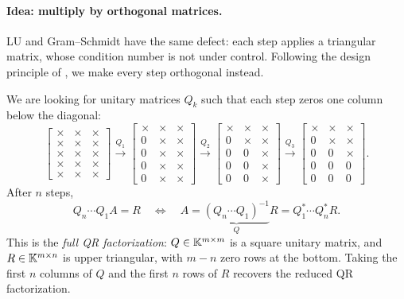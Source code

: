 \paragraph{Idea: multiply by orthogonal matrices.} LU and Gram--Schmidt have the same defect: each step applies a triangular matrix, whose condition number is not under control. Following the design principle of , we make every step orthogonal instead.

We are looking for unitary matrices $Q_k$ such that each step zeros one column below the diagonal:
\begin{equation}
  \begin{bmatrix} \times & \times & \times \\ \times & \times & \times \\ \times & \times & \times \\ \times & \times & \times \\ \times & \times & \times \end{bmatrix}
  \xrightarrow{Q_1}
  \begin{bmatrix} \times & \times & \times \\ 0 & \times & \times \\ 0 & \times & \times \\ 0 & \times & \times \\ 0 & \times & \times \end{bmatrix}
  \xrightarrow{Q_2}
  \begin{bmatrix} \times & \times & \times \\ 0 & \times & \times \\ 0 & 0 & \times \\ 0 & 0 & \times \\ 0 & 0 & \times \end{bmatrix}
  \xrightarrow{Q_3}
  \begin{bmatrix} \times & \times & \times \\ 0 & \times & \times \\ 0 & 0 & \times \\ 0 & 0 & 0 \\ 0 & 0 & 0 \end{bmatrix}.
\end{equation}
After $n$ steps,
\begin{equation}
  Q_n \cdots Q_1A = R \quad\iff\quad A = \underbrace{(Q_n \cdots Q_1)^{-1}}_{Q}R = Q_1^\ast \cdots Q_n^\ast R.
\end{equation}
This is the \emph{full QR factorization}: $Q \in \mathbb{K}^{m \times m}$ is a square unitary matrix, and $R \in \mathbb{K}^{m \times n}$ is upper triangular, with $m - n$ zero rows at the bottom.
Taking the first $n$ columns of $Q$ and the first $n$ rows of $R$ recovers the reduced QR factorization.

